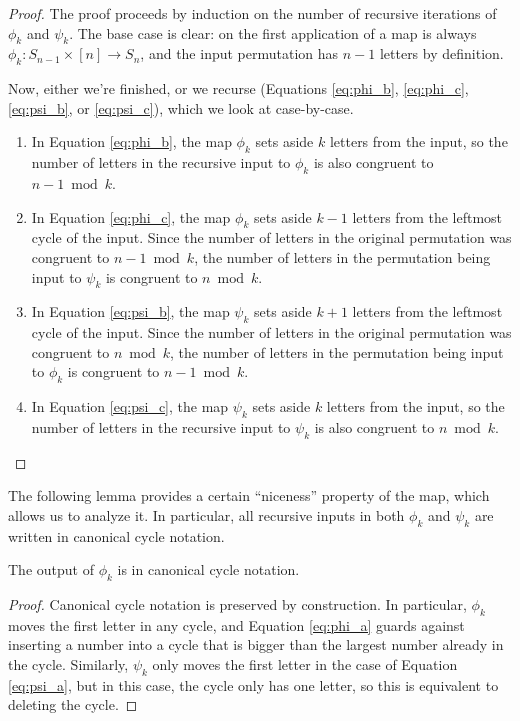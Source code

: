 \begin{proof}
  The proof proceeds by induction on the number of recursive iterations of
  $\phi_k$ and $\psi_k$. The base case is clear: on the first application of a
  map is always
  $\phi_k \colon S_{n-1} \times [n] \rightarrow S_n$, and the input permutation
  has $n-1$ letters by definition.

  Now, either we're finished, or we recurse
  (Equations \ref{eq:phi_b}, \ref{eq:phi_c}, \ref{eq:psi_b}, or \ref{eq:psi_c}),
  which we look at case-by-case.
  \begin{enumerate}[leftmargin=*, label={\textbf{Case \arabic*.}}]
    \item In Equation \ref{eq:phi_b}, the map $\phi_k$ sets aside $k$ letters from the input, so the number of letters in the recursive input to $\phi_k$ is also congruent to $n - 1 \bmod k$.
    \item In Equation \ref{eq:phi_c}, the map $\phi_k$ sets aside $k - 1$ letters from the leftmost cycle of the input. Since the number of letters in the original permutation was congruent to $n-1 \bmod k$, the number of letters in the permutation being input to $\psi_k$ is congruent to $n   \bmod k$.
    \item In Equation \ref{eq:psi_b}, the map $\psi_k$ sets aside $k + 1$ letters from the leftmost cycle of the input. Since the number of letters in the original permutation was congruent to $n   \bmod k$, the number of letters in the permutation being input to $\phi_k$ is congruent to $n-1 \bmod k$.
    \item In Equation \ref{eq:psi_c}, the map $\psi_k$ sets aside $k$ letters from the input, so the number of letters in the recursive input to $\psi_k$ is also congruent to $n \bmod k$.
  \end{enumerate}
\end{proof}
The following lemma provides a certain ``niceness'' property of the map,
which allows us to analyze it. In particular, all recursive inputs in both
$\phi_k$ and $\psi_k$ are written in canonical cycle notation.
\begin{lemma}
  The output of $\phi_k$ is in canonical cycle notation.
\end{lemma}
\begin{proof}
  Canonical cycle notation is preserved by construction.
  In particular, $\phi_k$ moves the first letter in any cycle, and
  Equation \ref{eq:phi_a} guards against inserting a number into a cycle that
  is bigger than the largest number already in the cycle.
  Similarly, $\psi_k$ only moves the first letter in the case of Equation
  \ref{eq:psi_a}, but in this case, the cycle only has one letter, so this is
  equivalent to deleting the cycle.
\end{proof}
